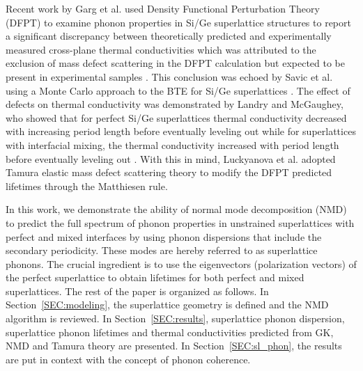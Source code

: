 Recent work by Garg et al. used Density Functional Perturbation Theory (DFPT) to examine phonon properties in Si/Ge superlattice structures to report a significant discrepancy between theoretically predicted and experimentally measured cross-plane thermal conductivities which was attributed to the exclusion of mass defect scattering in the DFPT calculation but expected to be present in experimental samples \cite{doi:10.1021/nl202186y}. This conclusion was echoed by Savic et al. using a Monte Carlo approach to the BTE for Si/Ge superlattices \cite{savic:073113}. The effect of defects on thermal conductivity was demonstrated by Landry and McGaughey, who showed that for perfect Si/Ge superlattices thermal conductivity decreased with increasing period length before eventually leveling out while for superlattices with interfacial mixing, the thermal conductivity increased with period length before eventually leveling out \cite{PhysRevB.79.075316}. With this in mind, Luckyanova et al. \cite{Luckyanova16112012} adopted Tamura elastic mass defect scattering theory \cite{tamura_isotope_1983} to modify the DFPT predicted lifetimes through the Matthiesen rule.

In this work, we demonstrate the ability of normal mode decomposition (NMD) to predict the full spectrum of phonon properties in unstrained superlattices with perfect and mixed interfaces by using phonon dispersions that include the secondary periodicity. These modes are hereby referred to as superlattice phonons. The crucial ingredient is to use the eigenvectors (polarization vectors) of the perfect superlattice to obtain lifetimes for both perfect and mixed superlattices. The rest of the paper is organized as follows. In Section~\ref{SEC:modeling}, the superlattice geometry is defined and the NMD algorithm is reviewed. In Section~\ref{SEC:results}, superlattice phonon dispersion, superlattice phonon lifetimes and thermal conductivities predicted from GK, NMD and Tamura theory are presented. In Section~\ref{SEC:sl_phon}, the results are put in context with the concept of phonon coherence.


